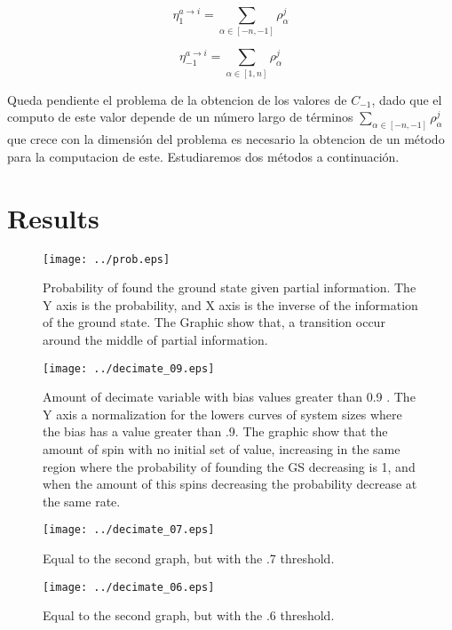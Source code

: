 \documentclass[11pt]{amsart}
\theoremstyle{definition} \newtheorem{defi}{Definition}
\begin{document}
	\begin{equation}
	\eta_1^{a \to i} = \sum_{\alpha \in [-n, -1]}\rho_\alpha^j
	\end{equation}
	
	\begin{equation}
	\eta_{-1}^{a \to i} = \sum_{\alpha \in [1, n]}\rho_\alpha^j
	\end{equation}

	Queda pendiente el problema de la obtencion de los valores de 
	$C_{-1}$, dado que el computo de este valor depende de un n\'umero 
	largo de t\'erminos $\sum_{\alpha \in [-n, -1]} \rho_{\alpha}^j$ que 
	crece con la dimensi\'on del problema es necesario la obtencion de un 
	m\'etodo para la computacion de este. Estudiaremos dos m\'etodos a continuaci\'on.


\section{Results}

\begin{figure}[h]
\centering
\texttt{[image: ../prob.eps]}
\caption{Probability of found the ground state given partial information. The Y axis is the probability, and X axis is the inverse of the information of the ground state. The Graphic show that, a transition occur around the middle of partial information.} 
\label{fig:Labs_Histogram}
\end{figure}

\begin{figure}[h]
\centering
\texttt{[image: ../decimate\_09.eps]}
\caption{Amount of decimate variable with bias values greater than 0.9 . The Y axis a normalization for the lowers curves of system sizes where the bias has a value greater than .9. The graphic show that the amount of spin with no initial set of value, increasing in the same region where the probability of founding the GS  decreasing is 1, and when the amount of this spins decreasing the probability decrease at the same rate.} 
\label{fig:Labs_Histogram}
\end{figure}


\begin{figure}[h]
\centering
\texttt{[image: ../decimate\_07.eps]}
\caption{Equal to the second graph, but with the .7 threshold.} 
\label{fig:Labs_Histogram}
\end{figure}

\begin{figure}[h]
\centering
\texttt{[image: ../decimate\_06.eps]}
\caption{Equal to the second graph, but with the .6 threshold.} 
\label{fig:Labs_Histogram}
\end{figure}
\end{document}
